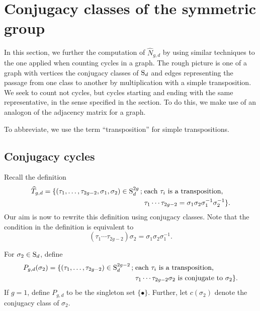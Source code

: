 \section{Conjugacy classes of the symmetric group}

In this section, we further the computation of $\widehat{N}_{g,d}$ by using similar techniques to the one applied when counting cycles in a graph. The rough picture is one of a graph with vertices the conjugacy classes of $\operatorname{S}_d$ and edges representing the passage from one class to another by multiplication with a simple transposition. We seek to count not cycles, but cycles starting and ending with the same representative, in the sense specified in the section. To do this, we make use of an analogon of the adjacency matrix for a graph.

To abbreviate, we use the term ``transposition'' for simple transpositions.

\subsection{Conjugacy cycles}

Recall the definition
\begin{align*}
 \widehat{T}_{g,d} = \{(\tau_1,\dotsc,\tau_{2g-2},\sigma_1,\sigma_2)\in \operatorname{S}_d^{2g} \,;\; &\text{each }\tau_i\text{ is a transposition,}\\ &\tau_1\dotsm\tau_{2g-2}=\sigma_1\sigma_2\sigma_1^{-1}\sigma_2^{-1}\}.
\end{align*}
Our aim is now to rewrite this definition using conjugacy classes. Note that the condition in the definition is equivalent to
\begin{equation} \label{eq:conj-cond}
 (\tau_1 \dotsm \tau_{2g-2})\sigma_2=\sigma_1\sigma_2\sigma_1^{-1}.
\end{equation}

\begin{defi}
 For $\sigma_2 \in \operatorname{S}_d$, define
 \begin{align*}
  P_{g,d}(\sigma_2) = \{(\tau_1,\dotsc,\tau_{2g-2})\in \operatorname{S}_d^{2g-2} \,;\; &\text{each }\tau_i\text{ is a transposition,}\\ &\tau_1\dotsm\tau_{2g-2}\sigma_2\text{ is conjugate to }\sigma_2\}.
 \end{align*}
 If $g=1$, define $P_{g,d}$ to be the singleton set $\{\bullet\}$.
 Further, let $c(\sigma_2)$ denote the conjugacy class of $\sigma_2$.
\end{defi}

